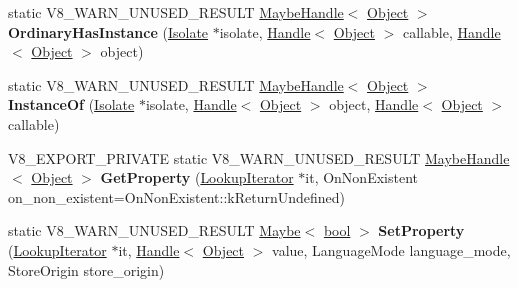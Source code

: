 \begin{DoxyCompactItemize}
\item 
\mbox{\label{classv8_1_1internal_1_1Object_a5c93a3264208e1188a58e7175dcfdb69}} 
static V8\+\_\+\+W\+A\+R\+N\+\_\+\+U\+N\+U\+S\+E\+D\+\_\+\+R\+E\+S\+U\+LT \mbox{\hyperlink{classv8_1_1internal_1_1MaybeHandle}{Maybe\+Handle}}$<$ \mbox{\hyperlink{classv8_1_1internal_1_1Object}{Object}} $>$ {\bfseries Ordinary\+Has\+Instance} (\mbox{\hyperlink{classv8_1_1internal_1_1Isolate}{Isolate}} $\ast$isolate, \mbox{\hyperlink{classv8_1_1internal_1_1Handle}{Handle}}$<$ \mbox{\hyperlink{classv8_1_1internal_1_1Object}{Object}} $>$ callable, \mbox{\hyperlink{classv8_1_1internal_1_1Handle}{Handle}}$<$ \mbox{\hyperlink{classv8_1_1internal_1_1Object}{Object}} $>$ object)
\item 
\mbox{\label{classv8_1_1internal_1_1Object_a74da43733232d236195529dced96c276}} 
static V8\+\_\+\+W\+A\+R\+N\+\_\+\+U\+N\+U\+S\+E\+D\+\_\+\+R\+E\+S\+U\+LT \mbox{\hyperlink{classv8_1_1internal_1_1MaybeHandle}{Maybe\+Handle}}$<$ \mbox{\hyperlink{classv8_1_1internal_1_1Object}{Object}} $>$ {\bfseries Instance\+Of} (\mbox{\hyperlink{classv8_1_1internal_1_1Isolate}{Isolate}} $\ast$isolate, \mbox{\hyperlink{classv8_1_1internal_1_1Handle}{Handle}}$<$ \mbox{\hyperlink{classv8_1_1internal_1_1Object}{Object}} $>$ object, \mbox{\hyperlink{classv8_1_1internal_1_1Handle}{Handle}}$<$ \mbox{\hyperlink{classv8_1_1internal_1_1Object}{Object}} $>$ callable)
\item 
\mbox{\label{classv8_1_1internal_1_1Object_afd989ae687c3ab242749eafc94e6277c}} 
V8\+\_\+\+E\+X\+P\+O\+R\+T\+\_\+\+P\+R\+I\+V\+A\+TE static V8\+\_\+\+W\+A\+R\+N\+\_\+\+U\+N\+U\+S\+E\+D\+\_\+\+R\+E\+S\+U\+LT \mbox{\hyperlink{classv8_1_1internal_1_1MaybeHandle}{Maybe\+Handle}}$<$ \mbox{\hyperlink{classv8_1_1internal_1_1Object}{Object}} $>$ {\bfseries Get\+Property} (\mbox{\hyperlink{classv8_1_1internal_1_1LookupIterator}{Lookup\+Iterator}} $\ast$it, On\+Non\+Existent on\+\_\+non\+\_\+existent=On\+Non\+Existent\+::k\+Return\+Undefined)
\item 
\mbox{\label{classv8_1_1internal_1_1Object_a674ba3c865414aa5272d16687e737114}} 
static V8\+\_\+\+W\+A\+R\+N\+\_\+\+U\+N\+U\+S\+E\+D\+\_\+\+R\+E\+S\+U\+LT \mbox{\hyperlink{classv8_1_1Maybe}{Maybe}}$<$ \mbox{\hyperlink{classbool}{bool}} $>$ {\bfseries Set\+Property} (\mbox{\hyperlink{classv8_1_1internal_1_1LookupIterator}{Lookup\+Iterator}} $\ast$it, \mbox{\hyperlink{classv8_1_1internal_1_1Handle}{Handle}}$<$ \mbox{\hyperlink{classv8_1_1internal_1_1Object}{Object}} $>$ value, Language\+Mode language\+\_\+mode, Store\+Origin store\+\_\+origin)

\end{DoxyCompactItemize}
